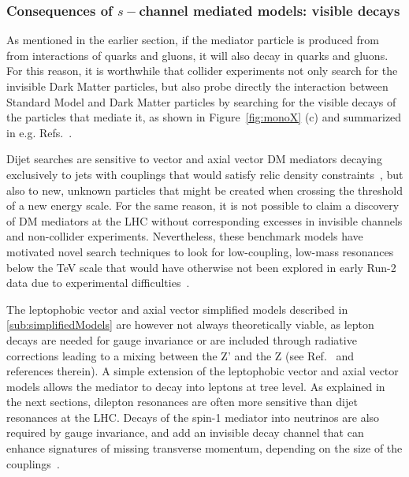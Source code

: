 \subsubsection{Consequences of $s-$channel mediated models: visible decays}
\label{sec:MediatorSearches}

As mentioned in the earlier section, if the mediator particle is produced from from interactions of
quarks and gluons, it will also decay in quarks and gluons. 
For this reason, it is worthwhile that collider experiments not only search for
the invisible Dark Matter particles, but also probe directly the interaction between Standard Model and 
Dark Matter particles by searching for the visible decays of the particles that mediate it, as shown 
in Figure~\ref{fig:monoX} (c) and summarized in e.g. Refs.~\cite{Liew:2016oon,Fairbairn:2016iuf}. 


Dijet searches are sensitive to vector and axial vector DM mediators decaying 
exclusively to jets with couplings that would satisfy relic density constraints~\cite{Chala:2015ama},
but also to new, unknown particles that might be created when crossing 
the threshold of a new energy scale. For the same reason, 
it is not possible to claim a discovery of DM mediators at the LHC without
corresponding excesses in invisible channels and non-collider experiments. 
Nevertheless, these benchmark models have motivated novel search techniques
to look for low-coupling, low-mass resonances below the TeV scale that would
have otherwise not been explored in early Run-2 data due to experimental difficulties~\cite{An:2012ue,Dobrescu:2013coa}. 

The leptophobic vector and axial vector simplified models described in \ref{sub:simplifiedModels} 
are however not always theoretically viable, as lepton decays are needed for gauge invariance
or are included through radiative corrections leading to a mixing between the Z' and the Z 
(see Ref.~\cite{Albert:2017onk} and references therein). A simple extension of the leptophobic vector
and axial vector models allows the mediator to decay into leptons at tree level. 
As explained in the next sections, dilepton resonances are often more sensitive than dijet resonances
at the LHC. Decays of the spin-1 mediator into neutrinos are also required by gauge invariance, and add 
an invisible decay channel that can enhance signatures of missing transverse momentum, depending on
the size of the couplings~\cite{Albert:2017onk}. 

